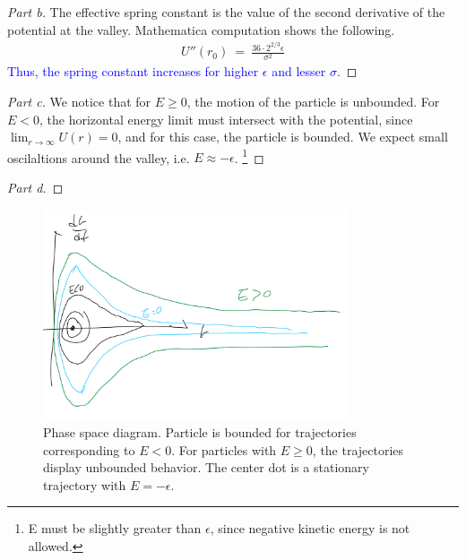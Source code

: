\documentclass{article}
\numberwithin{equation}{section}
\begin{document}
\begin{proof}[Part b]
    The effective spring constant is the value of the second derivative 
    of the potential at the valley. Mathematica computation shows the following. 
    \begin{align}
        U''(r_0) \ = \ \frac {36 \cdot 2^{2/3} \epsilon} {\sigma^2}
    \end{align}
    \textcolor{blue} {Thus, the spring constant increases for higher $\epsilon$ 
    and lesser $\sigma$}. 
\end{proof}

\begin{proof}[Part c]
    We notice that for $E \geq 0$, the motion of the particle is unbounded. 
    For $E < 0$, the horizontal energy limit must intersect with the 
    potential, since $\lim_{r \rightarrow \infty}U(r) = 0$, and for 
    this case, the particle is bounded. We expect small oscilaltions 
    around the valley, i.e. $E \approx -\epsilon$. \footnote{E must be 
    slightly greater than $\epsilon$, since negative kinetic energy is not allowed. } 
\end{proof}

\begin{proof}[Part d]
\end{proof}
\begin{figure}[htp]
    \centering
    \includegraphics[width=0.8\textwidth]{Q3_PhaseDiagram.png} %
    \caption{Phase space diagram. Particle is bounded for 
    trajectories corresponding to $E<0$. For particles with $E \geq 0$, 
    the trajectories display unbounded behavior. The center dot is a stationary trajectory with $E = -\epsilon$. }
    \label{fig:q3phaseSpace}
\end{figure}
\end{document}
